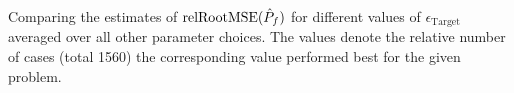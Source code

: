 Comparing the estimates of $\textup{relRootMSE}(\hat{P}_f)$ for different values of $\epsilon_{\text{Target}}$ averaged over  all other parameter choices. The values denote the relative number of cases (total 1560) the corresponding value performed best for the given problem.